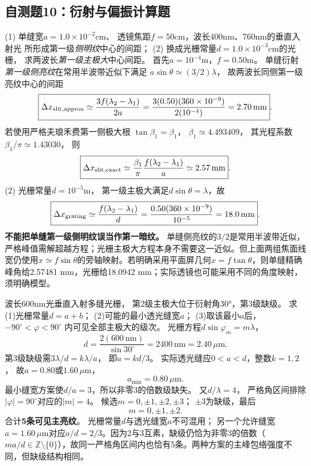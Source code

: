 \subsection{自测题10：衍射与偏振计算题}

\problemtext (1) 单缝宽$a=1.0\times10^{-2}$cm、
透镜焦距$f=50$cm，波长400nm、760nm的垂直入射光
所形成第一级\emph{侧明纹}中心的间距；
(2) 换成光栅常量$d=1.0\times10^{-3}$cm的光栅，
求两波长\emph{第一级主极大}中心间距。
\workings
首先$a=10^{-4}$m，$f=0.50$m。
单缝衍射\emph{第一级侧亮纹}在常用半波带近似下满足
$a\sin\theta\simeq(3/2)\lambda$，
故两波长同侧第一级亮纹中心的间距
\[
\boxed{\Delta x_{\rm slit,approx}
\simeq\frac{3f(\lambda_2-\lambda_1)}{2a}
=\frac{3(0.50)(360\times10^{-9})}{2(10^{-4})}
=2.70\,\mathrm{mm}}.
\]
若使用严格夫琅禾费第一侧极大根
$\tan\beta_1=\beta_1$，
$\beta_1\simeq4.493409$，
其光程系数$\beta_1/\pi\simeq1.43030$，
则
\[
\boxed{\Delta x_{\rm slit,exact}
\simeq\frac{\beta_1}{\pi}
\frac{f(\lambda_2-\lambda_1)}a
\simeq2.57\,\mathrm{mm}}.
\]
(2) 光栅常量$d=10^{-5}$m，
第一级主极大满足$d\sin\theta=\lambda$，故
\[
\boxed{\Delta x_{\rm grating}\simeq
\frac{f(\lambda_2-\lambda_1)}d
=\frac{0.50(360\times10^{-9})}{10^{-5}}
=18.0\,\mathrm{mm}}.
\]
\crosscheck \textbf{不能把单缝第一级侧明纹误当作第一暗纹。}
单缝侧亮纹的$3/2$是常用半波带近似，
严格峰值需解超越方程；光栅主极大方程本身不需要这一近似。但上面两组焦面线宽仍使用$x\simeq f\sin\theta$的旁轴映射。若明确采用平面屏几何$x=f\tan\theta$，则单缝精确峰角给2.57481 mm，光栅给18.0942 mm；实际透镜也可能采用不同的角度映射，须明确模型。

\problemtext 波长600nm光垂直入射多缝光栅，
第2级主极大位于衍射角30°，第3级缺级。
求(1)光栅常量$d=a+b$；
(2)可能的最小透光缝宽$a$；
(3)取该最小$a$后，$-90^\circ<\varphi<90^\circ$
内可见全部主极大的级次。
\workings
光栅方程$d\sin\varphi_m=m\lambda$，
\[
\boxed{d=\frac{2(600\,\mathrm{nm})}{\sin30^\circ}
=2400\,\mathrm{nm}=2.40\,\mu\mathrm m}.
\]
第3级缺级需$3\lambda/d=k\lambda/a$，
即$a=kd/3$。
实际透光缝应$0<a<d$，整数$k=1,2$，
故$a=0.80$或$1.60\,\mu$m，
\[
\boxed{a_{\min}=0.80\,\mu\mathrm m}.
\]
最小缝宽方案使$d/a=3$，所以非零3的倍数级缺失。
又$d/\lambda=4$，
严格角区间排除$|\varphi|=90^\circ$对应的$|m|=4$。
候选$m=0,\pm1,\pm2,\pm3$；
$\pm3$为缺级，最后
\[
\boxed{m=0,\pm1,\pm2}.
\]
合计\textbf{5条可见主亮纹}。
\crosscheck 光栅常量$d$与透光缝宽$a$不可混用；
另一个允许缝宽$a=1.60\,\mu$m对应$a/d=2/3$。因为2与3互素，缺级仍恰为非零3的倍数（$ma/d\in\mathbb Z\setminus\{0\}$），故同一严格角区间内也恰有5条。两种方案的主峰包络强度不同，但缺级结构相同。

